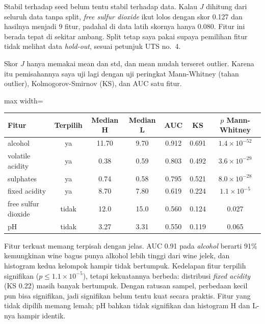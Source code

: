 Stabil terhadap seed belum tentu stabil terhadap data. Kalau $J$ dihitung dari seluruh data tanpa split, \emph{free sulfur dioxide} ikut lolos dengan skor 0.127 dan hasilnya menjadi 9 fitur, padahal di data latih skornya hanya 0.080. Fitur ini berada tepat di sekitar ambang. Split tetap saya pakai supaya pemilihan fitur tidak melihat data \emph{hold-out}, sesuai petunjuk UTS no.~4.

Skor $J$ hanya memakai mean dan std, dan mean mudah terseret outlier. Karena itu pemisahannya saya uji lagi dengan uji peringkat Mann-Whitney (tahan outlier), Kolmogorov-Smirnov (KS), dan AUC satu fitur.

\begin{adjustbox}{max width=\textwidth}\begin{tabular}{@{}lcccccc@{}}
\toprule
\textbf{Fitur} & \textbf{Terpilih} & \textbf{Median H} & \textbf{Median L} & \textbf{AUC} & \textbf{KS} & \textbf{$p$ Mann-Whitney} \\
\midrule
alcohol & ya & 11.70 & 9.70 & 0.912 & 0.691 & $1.4\times10^{-52}$ \\
volatile acidity & ya & 0.38 & 0.59 & 0.803 & 0.492 & $3.6\times10^{-29}$ \\
sulphates & ya & 0.74 & 0.58 & 0.795 & 0.521 & $8.0\times10^{-28}$ \\
fixed acidity & ya & 8.70 & 7.80 & 0.619 & 0.224 & $1.1\times10^{-5}$ \\
free sulfur dioxide & tidak & 12.0 & 15.0 & 0.560 & 0.124 & 0.027 \\
pH & tidak & 3.27 & 3.31 & 0.550 & 0.119 & 0.065 \\
\bottomrule
\end{tabular}\end{adjustbox}


Fitur terkuat memang terpisah dengan jelas. AUC 0.91 pada \emph{alcohol} berarti 91\% kemungkinan wine bagus punya alkohol lebih tinggi dari wine jelek, dan histogram kedua kelompok hampir tidak bertumpuk. Kedelapan fitur terpilih signifikan ($p \leq 1.1\times10^{-5}$), tetapi kekuatannya berbeda: distribusi \emph{fixed acidity} (KS 0.22) masih banyak bertumpuk. Dengan ratusan sampel, perbedaan kecil pun bisa signifikan, jadi signifikan belum tentu kuat secara praktis. Fitur yang tidak dipilih memang lemah; pH bahkan tidak signifikan dan histogram H dan L-nya hampir identik.

